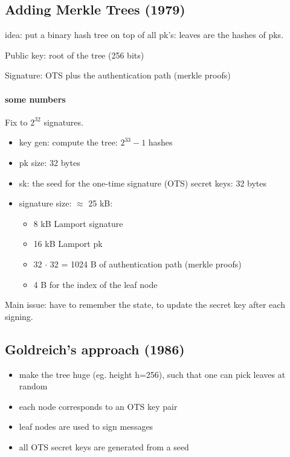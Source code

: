 \documentclass{article}
\theoremstyle{definition}
\begin{document}
\subsection{Adding Merkle Trees (1979)}
idea: put a binary hash tree on top of all pk's: leaves are the hashes of pks.

Public key: root of the tree (256 bits)

Signature: OTS plus the authentication path (merkle proofs)

\paragraph{some numbers}
Fix to $2^{32}$ signatures.
\begin{itemize}
    \item key gen: compute the tree: $2^{33} -1$ hashes
    \item pk size: 32 bytes
    \item sk: the seed for the one-time signature (OTS) secret keys: 32 bytes
    \item signature size: $\approx$ 25 kB:
	\begin{itemize}
	    \item 8 kB Lamport signature
	    \item 16 kB Lamport pk
	    \item 32 $\cdot$ 32 = 1024 B of authentication path (merkle proofs)
	    \item 4 B for the index of the leaf node
	\end{itemize}
\end{itemize}

Main issue: have to remember the state, to update the secret key after each signing.


\subsection{Goldreich's approach (1986)}

\begin{itemize}
    \item make the tree huge (eg. height h=256), such that one can pick leaves at random
    \item each node corresponds to an OTS key pair
    \item leaf nodes are used to sign messages
    \item all OTS secret keys are generated from a seed
\end{itemize}
\end{document}
